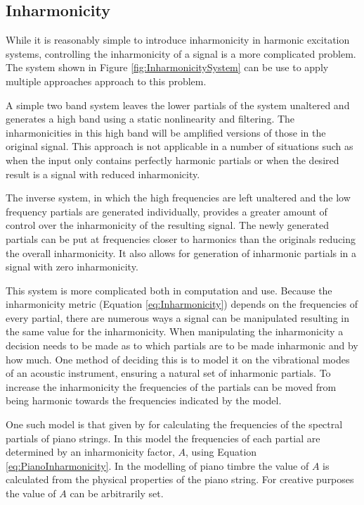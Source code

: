 	\subsection{Inharmonicity}
	\label{sec:FeatureControl-Parameterisation-Inharmonicity}
		While it is reasonably simple to introduce inharmonicity in harmonic excitation systems, controlling the
		inharmonicity of a signal is a more complicated problem. The system shown in Figure
		\ref{fig:InharmonicitySystem} can be use to apply multiple approaches approach to this problem. 

		A simple two band system leaves the lower partials of the system unaltered and generates a high band using
		a static nonlinearity and filtering. The inharmonicities in this high band will be amplified versions of
		those in the original signal. This approach is not applicable in a number of situations such as when the
		input only contains perfectly harmonic partials or when the desired result is a signal with reduced
		inharmonicity.
		
		The inverse system, in which the high frequencies are left unaltered and the low frequency partials are
		generated individually, provides a greater amount of control over the inharmonicity of the resulting
		signal. The newly generated partials can be put at frequencies closer to harmonics than the originals
		reducing the overall inharmonicity. It also allows for generation of inharmonic partials in a signal with
		zero inharmonicity. 

		This system is more complicated both in computation and use. Because the inharmonicity metric (Equation
		\ref{eq:Inharmonicity}) depends on the frequencies of every partial, there are numerous ways a signal can
		be manipulated resulting in the same value for the inharmonicity. When manipulating the inharmonicity a
		decision needs to be made as to which partials are to be made inharmonic and by how much. One method of
		deciding this is to model it on the vibrational modes of an acoustic instrument, ensuring a natural set of
		inharmonic partials. To increase the inharmonicity the frequencies of the partials can be moved from being
		harmonic towards the frequencies indicated by the model.

		One such model is that given by \citet{rossing2002the} for calculating the frequencies of the spectral
		partials of piano strings. In this model the frequencies of each partial are determined by an inharmonicity
		factor, $A$, using Equation \ref{eq:PianoInharmonicity}. In the modelling of piano timbre the value of $A$
		is calculated from the physical properties of the piano string. For creative purposes the value of $A$ can
		be arbitrarily set.

